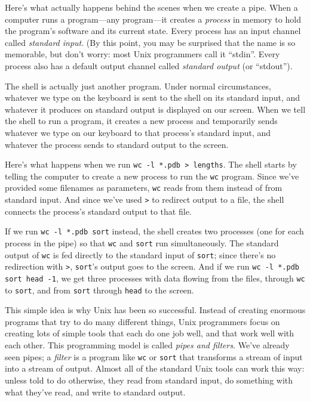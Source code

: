 \documentclass[]{book}
\newcommand{\gdef}[2]{\emph{#2}}
\begin{document}
Here's what actually happens behind the scenes when we create a pipe.
When a computer runs a program---any program---it creates a
\gdef{g:process}{process} in memory to hold the program's software
and its current state. Every process has an input channel called
\gdef{g:standard-input}{standard input}. (By this point, you may be
surprised that the name is so memorable, but don't worry: most Unix
programmers call it ``stdin''. Every process also has a default output
channel called \gdef{g:standard-output}{standard output} (or
``stdout'').

The shell is actually just another program. Under normal circumstances,
whatever we type on the keyboard is sent to the shell on its standard
input, and whatever it produces on standard output is displayed on our
screen. When we tell the shell to run a program, it creates a new
process and temporarily sends whatever we type on our keyboard to that
process's standard input, and whatever the process sends to standard
output to the screen.

Here's what happens when we run
\texttt{wc -l *.pdb \textgreater{} lengths}. The shell starts by telling
the computer to create a new process to run the \texttt{wc} program.
Since we've provided some filenames as parameters, \texttt{wc} reads
from them instead of from standard input. And since we've used
\texttt{\textgreater{}} to redirect output to a file, the shell connects
the process's standard output to that file.

If we run \texttt{wc -l *.pdb \textbar{} sort} instead, the shell
creates two processes (one for each process in the pipe) so that
\texttt{wc} and \texttt{sort} run simultaneously. The standard output of
\texttt{wc} is fed directly to the standard input of \texttt{sort};
since there's no redirection with \texttt{\textgreater{}},
\texttt{sort}'s output goes to the screen. And if we run
\texttt{wc -l *.pdb \textbar{} sort \textbar{} head -1}, we get three
processes with data flowing from the files, through \texttt{wc} to
\texttt{sort}, and from \texttt{sort} through \texttt{head} to the
screen.

This simple idea is why Unix has been so successful. Instead of creating
enormous programs that try to do many different things, Unix programmers
focus on creating lots of simple tools that each do one job well, and
that work well with each other. This programming model is called
\gdef{g:pipe-and-filter}{pipes and filters}. We've already seen
pipes; a \gdef{g:filter}{filter} is a program like \texttt{wc} or
\texttt{sort} that transforms a stream of input into a stream of output.
Almost all of the standard Unix tools can work this way: unless told to
do otherwise, they read from standard input, do something with what
they've read, and write to standard output.
\end{document}
